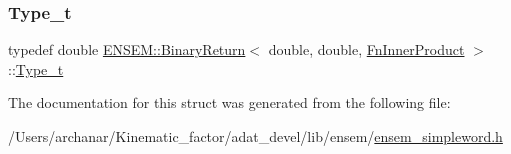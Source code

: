 \mbox{\label{structENSEM_1_1BinaryReturn_3_01double_00_01double_00_01FnInnerProduct_01_4_ad70792f5fdfdd15bfa202a4282cb068b}} 
\subsubsection{\texorpdfstring{Type\_t}{Type\_t}\hspace{0.1cm}{\footnotesize\ttfamily [2/2]}}
{\footnotesize\ttfamily typedef double \mbox{\hyperlink{structENSEM_1_1BinaryReturn}{E\+N\+S\+E\+M\+::\+Binary\+Return}}$<$ double, double, \mbox{\hyperlink{structENSEM_1_1FnInnerProduct}{Fn\+Inner\+Product}} $>$\+::\mbox{\hyperlink{structENSEM_1_1BinaryReturn_3_01double_00_01double_00_01FnInnerProduct_01_4_ad70792f5fdfdd15bfa202a4282cb068b}{Type\+\_\+t}}}



The documentation for this struct was generated from the following file\+:\begin{DoxyCompactItemize}
\item 
/\+Users/archanar/\+Kinematic\+\_\+factor/adat\+\_\+devel/lib/ensem/\mbox{\hyperlink{lib_2ensem_2ensem__simpleword_8h}{ensem\+\_\+simpleword.\+h}}\end{DoxyCompactItemize}
